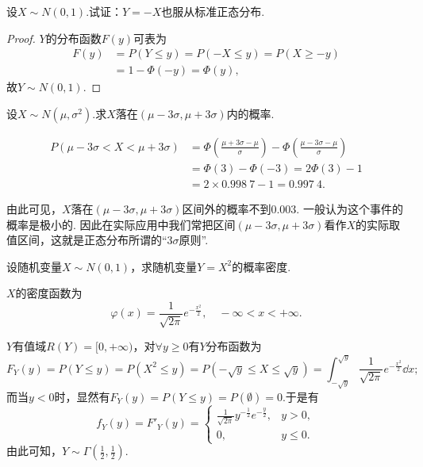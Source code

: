 \begin{example}
设\(X \sim N(0,1)\).试证：\(Y=-X\)也服从标准正态分布.
\begin{proof}
\(Y\)的分布函数\(F(y)\)可表为\begin{align*}
F(y) &= P(Y \leqslant y) = P(-X \leqslant y) = P(X \geqslant -y) \\
&= 1 - \Phi(-y) = \Phi(y),
\end{align*}故\(Y \sim N(0,1)\).
\end{proof}
\end{example}

\begin{example}
设\(X \sim N(\mu,\sigma^2)\).求\(X\)落在\((\mu-3\sigma,\mu+3\sigma)\)内的概率.
\begin{solution}
\begin{align*}
P(\mu-3\sigma<X<\mu+3\sigma)
&= \Phi\left(\frac{\mu+3\sigma-\mu}{\sigma}\right)
- \Phi\left(\frac{\mu-3\sigma-\mu}{\sigma}\right) \\
&= \Phi(3) - \Phi(-3) = 2\Phi(3) - 1 \\
&= 2 \times 0.998\ 7 - 1 = 0.997\ 4.
\end{align*}
\end{solution}
\end{example}
由此可见，\(X\)落在\((\mu-3\sigma,\mu+3\sigma)\)区间外的概率不到\(0.003\).
一般认为这个事件的概率是极小的.
因此在实际应用中我们常把区间\((\mu-3\sigma,\mu+3\sigma)\)看作\(X\)的实际取值区间，这就是正态分布所谓的“\(3\sigma\)原则”.

\begin{example}
设随机变量\(X \sim N(0,1)\)，求随机变量\(Y = X^2\)的概率密度.
\begin{solution}
\(X\)的密度函数为\[
\varphi(x) = \frac{1}{\sqrt{2\pi}} e^{-\frac{x^2}{2}},
\quad -\infty < x < +\infty.
\]

\(Y\)有值域\(R(Y) = [0,+\infty)\)，对\(\forall y \geqslant 0\)有\(Y\)分布函数为\[
F_Y(y) = P(Y \leqslant y) = P(X^2 \leqslant y)
= P(-\sqrt{y} \leqslant X \leqslant \sqrt{y})
= \int_{-\sqrt{y}}^{\sqrt{y}}{\frac{1}{\sqrt{2\pi}} e^{-\frac{x^2}{2}} \dd{x}};
\]而当\(y < 0\)时，显然有\(F_Y(y) = P(Y \leqslant y) = P(\emptyset) = 0\).于是有\[
f_Y(y) = F'_Y(y) = \left\{ \begin{array}{ll}
\frac{1}{\sqrt{2\pi}} y^{-\frac{1}{2}} e^{-\frac{y}{2}}, & y > 0, \\
0, & y \leqslant 0.
\end{array} \right.
\]
由此可知，\(Y \sim \Gamma\left(\frac{1}{2},\frac{1}{2}\right)\).
\end{solution}
\end{example}



